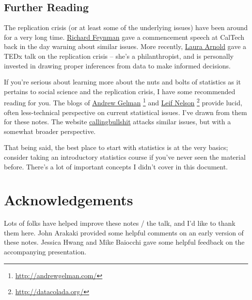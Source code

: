 \documentclass{tufte-handout}
\begin{document}
\subsection{Further Reading}
\label{sec:org8ce67ce}
The replication crisis (or at least some of the underlying issues) have been
around for a very long time. \href{http://calteches.library.caltech.edu/51/2/CargoCult.htm}{Richard Feynman} gave a commencement speech at
CalTech back in the day warning about similar issues. More recently, \href{https://www.youtube.com/watch?v=J5A5o9I7rnA\&list=WL\&index=21}{Laura
Arnold} gave a TEDx talk on the replication crisis -- she's a philanthropist, and
is personally invested in drawing proper inferences from data to make informed
decisions.

If you're serious about learning more about the nuts and bolts of statistics as
it pertains to social science and the replication crisis, I have some
recommended reading for you. The blogs of \href{http://andrewgelman.com/}{Andrew Gelman}
\footnote{\url{http://andrewgelman.com/}} and \href{http://datacolada.org/}{Leif Nelson} \footnote{\url{http://datacolada.org/}}
provide lucid, often less-technical perspective on current statistical issues.
I've drawn from them for these notes. The website \href{http://callingbullshit.org/syllabus.html}{callingbullshit} attacks
similar issues, but with a somewhat broader perspective.

That being said, the best place to start with statistics is at the very basics;
consider taking an introductory statistics course if you've never seen the
material before. There's a lot of important concepts I didn't cover in this
document.

\section{Acknowledgements}
\label{sec:org7d2cde4}
Lots of folks have helped improve these notes / the talk, and I'd like to thank
them here. John Arakaki provided some helpful comments on an early version of
these notes. Jessica Hwang and Mike Baiocchi gave some helpful feedback on the
accompanying presentation.



\end{document}
